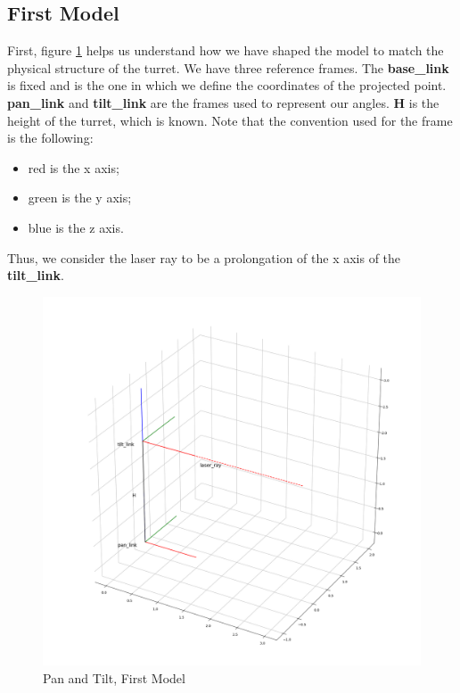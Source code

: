 \subsection{First Model}
First, figure \ref{fig:firstModel} helps us understand how we have shaped the model to match the physical structure of the turret. We have three reference frames. The \textbf{base\_link} is fixed and is the one in which we define the coordinates of the projected point. \textbf{pan\_link} and \textbf{tilt\_link} are the frames used to represent our angles.
\textbf{H} is the height of the turret, which is known. Note that the convention used for the frame is the following:
\begin{itemize}
    \item red is the x axis;
    \item green is the y axis;
    \item blue is the z axis.
\end{itemize}
Thus, we consider the laser ray to be a prolongation of the x axis of the \textbf{tilt\_link}.
\begin{figure}
	\centering
	\includegraphics[width=\textwidth]{img/firstModel.png}%
	\caption{Pan and Tilt, First Model}
	\label{fig:firstModel}
\end{figure}

\\

